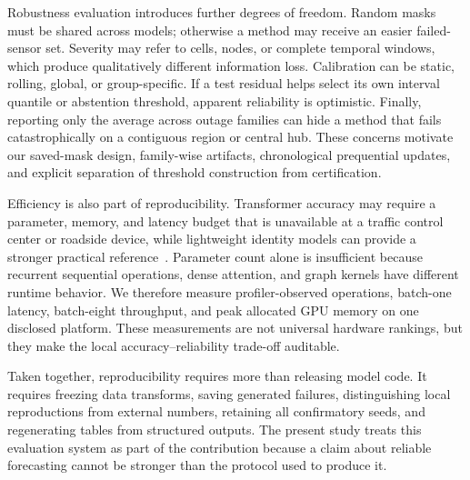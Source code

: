 \documentclass[pdflatex,sn-mathphys-num]{sn-jnl}
\begin{document}
Robustness evaluation introduces further degrees of freedom. Random masks must
be shared across models; otherwise a method may receive an easier failed-sensor
set. Severity may refer to cells, nodes, or complete temporal windows, which
produce qualitatively different information loss. Calibration can be static,
rolling, global, or group-specific. If a test residual helps select its own
interval quantile or abstention threshold, apparent reliability is optimistic.
Finally, reporting only the average across outage families can hide a method
that fails catastrophically on a contiguous region or central hub. These
concerns motivate our saved-mask design, family-wise artifacts, chronological
prequential updates, and explicit separation of threshold construction from
certification.

Efficiency is also part of reproducibility. Transformer accuracy may require a
parameter, memory, and latency budget that is unavailable at a traffic control
center or roadside device, while lightweight identity models can provide a
stronger practical reference~\cite{shao2022stid,liu2023staeformer}. Parameter
count alone is insufficient because recurrent sequential operations, dense
attention, and graph kernels have different runtime behavior. We therefore
measure profiler-observed operations, batch-one latency, batch-eight
throughput, and peak allocated GPU memory on one disclosed platform. These
measurements are not universal hardware rankings, but they make the local
accuracy--reliability trade-off auditable.

Taken together, reproducibility requires more than releasing model code. It
requires freezing data transforms, saving generated failures, distinguishing
local reproductions from external numbers, retaining all confirmatory seeds,
and regenerating tables from structured outputs. The present study treats this
evaluation system as part of the contribution because a claim about reliable
forecasting cannot be stronger than the protocol used to produce it.
\end{document}
